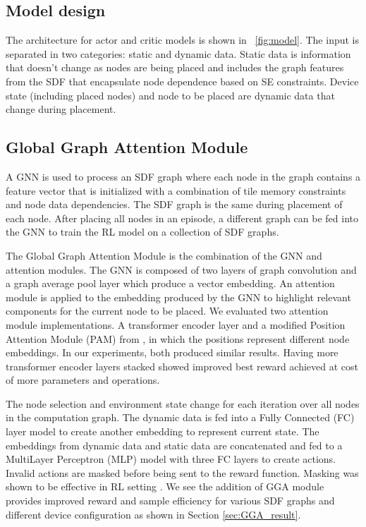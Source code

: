 \subsection{Model design}
The architecture for actor and critic models is shown in \figurename~\ref{fig:model}.
The input is separated in two categories: static and dynamic data. 
Static data is information that doesn't change as nodes are being placed and includes the graph features from the SDF that encapsulate node dependence based on SE constraints.
Device state (including placed nodes) and node to be placed are dynamic data that change during placement.

\subsection{Global Graph Attention Module}

A GNN is used to process an SDF graph where each node in the graph contains a feature vector that is initialized with a combination of tile memory constraints and node data dependencies. 
The SDF graph is the same during placement of each node. 
After placing all nodes in an episode, a different graph can be fed into the GNN to train the RL model on a collection of SDF graphs. 

The Global Graph Attention Module is the combination of the GNN and attention modules.
The GNN is composed of two layers of graph convolution \cite{wu2019simplifying} and a graph average pool layer which produce a vector embedding.
An attention module is applied to the embedding produced by the GNN to highlight relevant components for the current node to be placed. 
We evaluated two attention module implementations. A transformer encoder layer \cite{vaswani2017attention} and a modified Position Attention Module (PAM) from \cite{fu2019dual}, in which the positions represent different node embeddings.
In our experiments, both produced similar results. 
Having more transformer encoder layers stacked showed improved best reward achieved at cost of more parameters and operations.

The node selection and environment state change for each iteration over all nodes in the computation graph. 
The dynamic data is fed into a Fully Connected (FC) layer model to create another embedding to represent current state. 
The embeddings from dynamic data and static data are concatenated and fed to a MultiLayer Perceptron (MLP) model with three FC layers to create actions. 
Invalid actions are masked before being sent to the reward function. 
Masking was shown to be effective in RL setting \cite{Shengyi_mask}.
We see the addition of GGA module provides improved reward and sample efficiency for various SDF graphs and different device configuration as shown in Section \ref{sec:GGA_result}.

